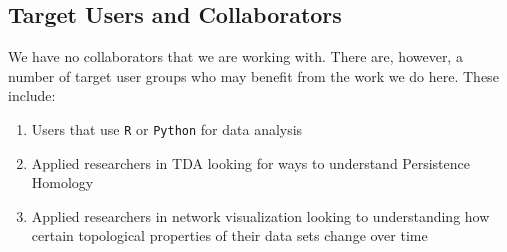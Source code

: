 \documentclass{vgtc}                          %
\begin{document}








\subsection{Target Users and Collaborators}
We have no collaborators that we are working with. There are, however, a number of target user groups who may benefit from the work we do here. These include: 
\begin{enumerate}
    \item Users that use \texttt{R} or \texttt{Python} for data analysis 
    \item Applied researchers in TDA looking for ways to understand Persistence Homology
    \item Applied researchers in network visualization looking to understanding how certain topological properties of their data sets change over time
\end{enumerate}

\end{document}
